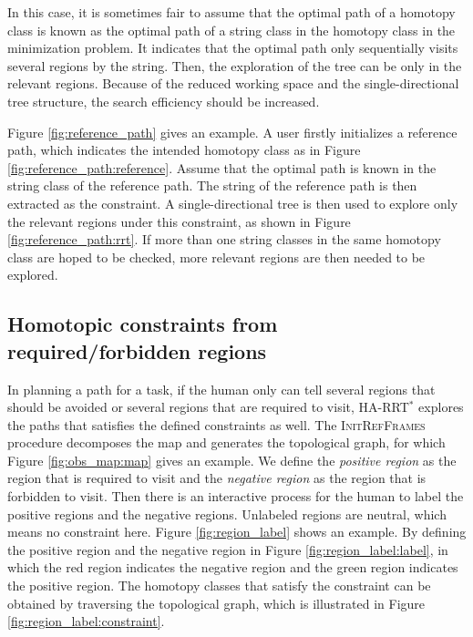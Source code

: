 \documentclass[letterpaper, 10 pt, conference]{ieeeconf}
\begin{document}
In this case, it is sometimes fair to assume that the optimal path of a homotopy class is known as the optimal path of a string class in the homotopy class in the minimization problem.
It indicates that the optimal path only sequentially visits several regions by the string.
Then, the exploration of the tree can be only in the relevant regions.
Because of the reduced working space and the single-directional tree structure, the search efficiency should be increased.

Figure \ref{fig:reference_path} gives an example.
A user firstly initializes a reference path, which indicates the intended homotopy class as in Figure \ref{fig:reference_path:reference}.
Assume that the optimal path is known in the string class of the reference path.
The string of the reference path is then extracted as the constraint.
A single-directional tree is then used to explore only the relevant regions under this constraint, as shown in Figure \ref{fig:reference_path:rrt}.
If more than one string classes in the same homotopy class are hoped to be checked, more relevant regions are then needed to be explored.

\subsection{Homotopic constraints from required/forbidden regions}
\label{sec:region_constraint}

In planning a path for a task, if the human only can tell several regions that should be avoided or several regions that are required to visit, HA-RRT$^{*}$ explores the paths that satisfies the defined constraints as well.
The \textsc{InitRefFrames} procedure decomposes the map and generates the topological graph, for which Figure \ref{fig:obs_map:map} gives an example.
We define the \emph{positive region} as the region that is required to visit and the \emph{negative region} as the region that is forbidden to visit.
Then there is an interactive process for the human to label the positive regions and the negative regions.
Unlabeled regions are neutral, which means no constraint here.
Figure \ref{fig:region_label} shows an example.
By defining the positive region and the negative region in Figure \ref{fig:region_label:label}, in which the red region indicates the negative region and the green region indicates the positive region.
The homotopy classes that satisfy the constraint can be obtained by traversing the topological graph, which is illustrated in Figure \ref{fig:region_label:constraint}.
\end{document}
